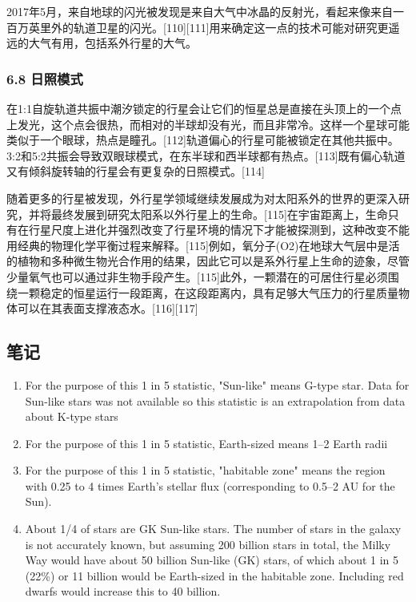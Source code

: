 2017年5月，来自地球的闪光被发现是来自大气中冰晶的反射光，看起来像来自一百万英里外的轨道卫星的闪光。[110][111]用来确定这一点的技术可能对研究更遥远的大气有用，包括系外行星的大气。
\subsubsection{6.8 日照模式}
在1:1自旋轨道共振中潮汐锁定的行星会让它们的恒星总是直接在头顶上的一个点上发光，这个点会很热，而相对的半球却没有光，而且非常冷。这样一个星球可能类似于一个眼球，热点是瞳孔。[112]轨道偏心的行星可能被锁定在其他共振中。3:2和5:2共振会导致双眼球模式，在东半球和西半球都有热点。[113]既有偏心轨道又有倾斜旋转轴的行星会有更复杂的日照模式。[114]

随着更多的行星被发现，外行星学领域继续发展成为对太阳系外的世界的更深入研究，并将最终发展到研究太阳系以外行星上的生命。[115]在宇宙距离上，生命只有在行星尺度上进化并强烈改变了行星环境的情况下才能被探测到，这种改变不能用经典的物理化学平衡过程来解释。[115]例如，氧分子(O2)在地球大气层中是活的植物和多种微生物光合作用的结果，因此它可以是系外行星上生命的迹象，尽管少量氧气也可以通过非生物手段产生。[115]此外，一颗潜在的可居住行星必须围绕一颗稳定的恒星运行一段距离，在这段距离内，具有足够大气压力的行星质量物体可以在其表面支撑液态水。[116][117]

\subsection{笔记}
\begin{enumerate}
\item For the purpose of this 1 in 5 statistic, "Sun-like" means G-type star. Data for Sun-like stars was not available so this statistic is an extrapolation from data about K-type stars
\item For the purpose of this 1 in 5 statistic, Earth-sized means 1–2 Earth radii
\item For the purpose of this 1 in 5 statistic, "habitable zone" means the region with 0.25 to 4 times Earth's stellar flux (corresponding to 0.5–2 AU for the Sun).
\item About 1/4 of stars are GK Sun-like stars. The number of stars in the galaxy is not accurately known, but assuming 200 billion stars in total, the Milky Way would have about 50 billion Sun-like (GK) stars, of which about 1 in 5 (22\%) or 11 billion would be Earth-sized in the habitable zone. Including red dwarfs would increase this to 40 billion.
\end{enumerate}


